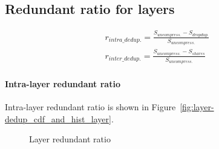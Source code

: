 \subsection{Redundant ratio for layers}

\begin{eqnarray}
r_{intra\_dedup.} = \frac{S_{uncompress.} - S_{dropdup.}}{S_{uncompress.}} \\
r_{inter\_dedup.} = \frac{S_{uncompress.} - S_{shares}}{S_{uncompress.}}
\end{eqnarray}

\paragraph{Intra-layer redundant ratio} Intra-layer redundant ratio is shown in Figure~\ref{fig:layer-dedup_cdf_and_hist_layer}.

\begin{figure}
	\centering
	\caption{Layer redundant ratio}
	\label{fig:layer-dedup-ratio}
\end{figure}

